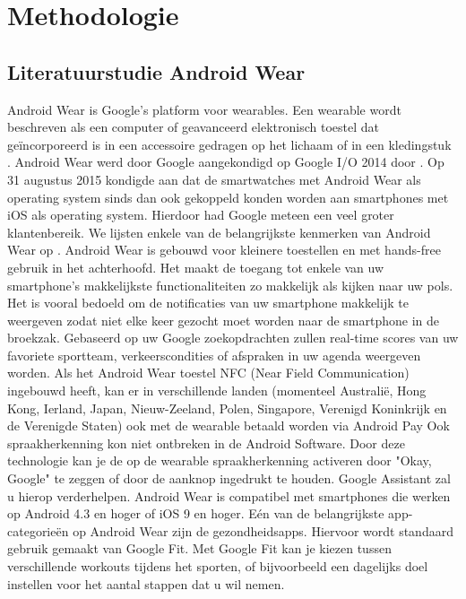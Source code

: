 
\chapter{Methodologie}
\label{ch:methodologie}


\section{Literatuurstudie Android Wear}
\label{sec:androidwear}
Android Wear is Google's platform voor wearables. Een wearable wordt beschreven als een computer of geavanceerd elektronisch toestel dat geïncorporeerd is in een accessoire gedragen op het lichaam of in een kledingstuk \autocite{Dictionary}. Android Wear werd door Google aangekondigd op Google I/O 2014 door \autocite{googleio}. Op 31 augustus 2015 kondigde \autocite{googleios} aan dat de smartwatches met Android Wear als operating system sinds dan ook gekoppeld konden worden aan smartphones met iOS als operating system. Hierdoor had Google meteen een veel groter klantenbereik.
We lijsten enkele van de  belangrijkste kenmerken van Android Wear op \autocite{Techradar}.
Android Wear is gebouwd voor kleinere toestellen en met hands-free gebruik in het achterhoofd. Het maakt de toegang tot enkele van uw smartphone's makkelijkste functionaliteiten zo makkelijk als kijken naar uw pols. Het is vooral bedoeld om de notificaties van uw smartphone makkelijk te weergeven zodat niet elke keer gezocht moet worden naar de smartphone in de broekzak. Gebaseerd op uw Google zoekopdrachten zullen real-time scores van uw favoriete sportteam, verkeerscondities of afspraken in uw agenda weergeven worden. Als het Android Wear toestel NFC (Near Field Communication) ingebouwd heeft, kan er in verschillende landen (momenteel Australië, Hong Kong, Ierland, Japan, Nieuw-Zeeland, Polen, Singapore, Verenigd Koninkrijk en de Verenigde Staten) ook met de wearable betaald worden via Android Pay \autocite{Androidpay} Ook spraakherkenning kon niet ontbreken in de Android Software. Door deze technologie kan je de op de wearable spraakherkenning activeren door "Okay, Google" te zeggen of door de aanknop ingedrukt te houden. Google Assistant zal u hierop verderhelpen. Android Wear is compatibel met smartphones die werken op Android 4.3 en hoger of iOS 9 en hoger. Eén van de belangrijkste app-categorieën op Android Wear zijn de gezondheidsapps. Hiervoor wordt standaard gebruik gemaakt van Google Fit. Met Google Fit kan je kiezen tussen verschillende workouts tijdens het sporten, of bijvoorbeeld een dagelijks doel instellen voor het aantal stappen dat u wil nemen.  
